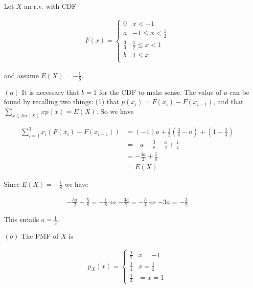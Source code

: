 \documentclass[a4paper, 12pt]{article}
\begin{document}
\pagebreak 

Let $X$ an r.v. with CDF

\begin{align*}
    F(x) = \begin{cases}
        0 & x < -1 \\
        a & -1 \leq x < \frac{1}{2} \\
        \frac{3}{4} & \frac{1}{2} \leq x < 1\\
        b & 1 \leq x \\
    \end{cases}
\end{align*}

and assume $E(X) = -\frac{1}{8}$.


$(a)$ It is necessary that $b = 1$ for the CDF to make sense. The value of 
$a$ can be found by recalling two things: (1) that $p(x_i) = F(x_i) - F(x_{i-1})$,
and that $\sum_{x \in Im(X)} x p(x) = E(X)$. So we have 

\begin{align*}
    \sum_{i = 1}^{3} x_i \left( F(x_i) - F(x_{i-1}) \right) &= (-1)a + \frac{1}{2} \left( \frac{3}{4} - a \right) + \left( 1 - \frac{3}{4} \right) \\ 
                                                            &= -a + \frac{3}{8} -\frac{a}{2} + \frac{1}{4} \\ 
                                                            &= - \frac{3a}{2} + \frac{5}{8} \\ 
                                                            &= E(X)
\end{align*}

Since $E(X) = -\frac{1}{8}$ we have 

\begin{align*}
    - \frac{3a}{2} + \frac{5}{8} = -\frac{1}{8} \iff -\frac{3a}{2} = -\frac{3}{4} \iff -3a = -\frac{3}{2}
\end{align*}

This entails $a = \frac{1}{2}$.

$(b)$ The PMF of $X$ is 

\begin{align*}
    p_X(x) = \begin{cases}
        \frac{1}{2} & x = -1 \\ 
        \frac{1}{4} & x = \frac{1}{2} \\ 
        \frac{1}{4} &= x = 1
    \end{cases}
\end{align*}
\end{document}
